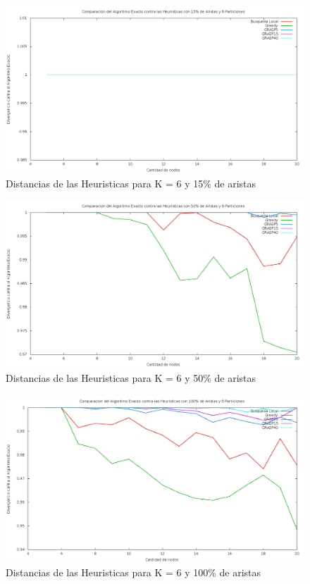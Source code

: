 \begin{figure}[H]
\begin{center}
\includegraphics[scale=0.3]{finales/ComparacionesCon6Particiones15Aristas.png}
\caption{Distancias de las Heuristicas para K = 6 y 15\% de aristas}
\end{center}
\end{figure}

\begin{figure}[H]
\begin{center}
\includegraphics[scale=0.3]{finales/ComparacionesCon6Particiones50Aristas.png}
\caption{Distancias de las Heuristicas para K = 6 y 50\% de aristas}
\end{center}
\end{figure}

\begin{figure}[H]
\begin{center}
\includegraphics[scale=0.3]{finales/ComparacionesCon6Particiones100Aristas.png}
\caption{Distancias de las Heuristicas para K = 6 y 100\% de aristas}
\end{center}
\end{figure}


